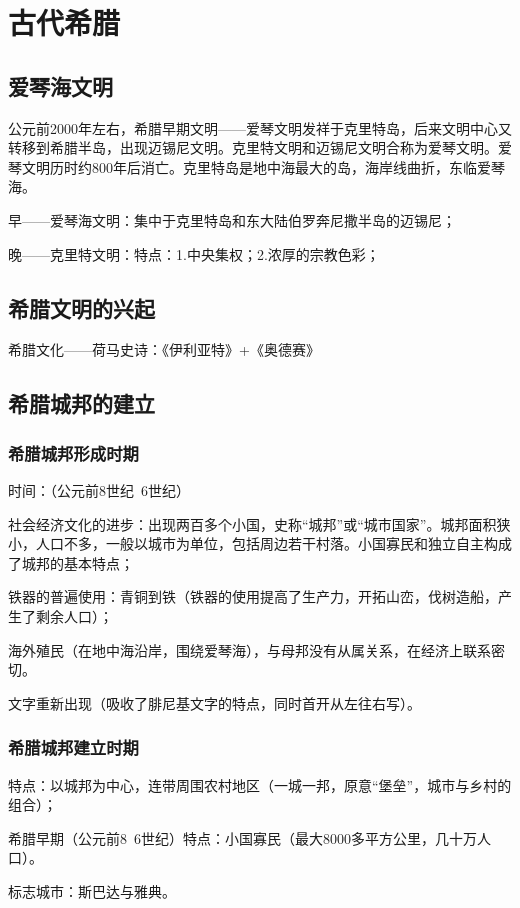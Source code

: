 \section{古代希腊}

\subsection{爱琴海文明}
公元前2000年左右，希腊早期文明——爱琴文明发祥于克里特岛，后来文明中心又转移到希腊半岛，出现迈锡尼文明。克里特文明和迈锡尼文明合称为爱琴文明。爱琴文明历时约800年后消亡。克里特岛是地中海最大的岛，海岸线曲折，东临爱琴海。

早——爱琴海文明：集中于克里特岛和东大陆伯罗奔尼撒半岛的迈锡尼；

晚——克里特文明：特点：1.中央集权；2.浓厚的宗教色彩；

\subsection{希腊文明的兴起}
希腊文化——荷马史诗：《伊利亚特》+《奥德赛》

\subsection{希腊城邦的建立}
\subsubsection{希腊城邦形成时期}
时间：（公元前8世纪~6世纪）

社会经济文化的进步：出现两百多个小国，史称“城邦”或“城市国家”。城邦面积狭小，人口不多，一般以城市为单位，包括周边若干村落。小国寡民和独立自主构成了城邦的基本特点；

铁器的普遍使用：青铜到铁（铁器的使用提高了生产力，开拓山峦，伐树造船，产生了剩余人口）；

海外殖民（在地中海沿岸，围绕爱琴海），与母邦没有从属关系，在经济上联系密切。

文字重新出现（吸收了腓尼基文字的特点，同时首开从左往右写）。

\subsubsection{希腊城邦建立时期}
特点：以城邦为中心，连带周围农村地区（一城一邦，原意“堡垒”，城市与乡村的组合）；

希腊早期（公元前8~6世纪）特点：小国寡民（最大8000多平方公里，几十万人口）。

标志城市：斯巴达与雅典。

